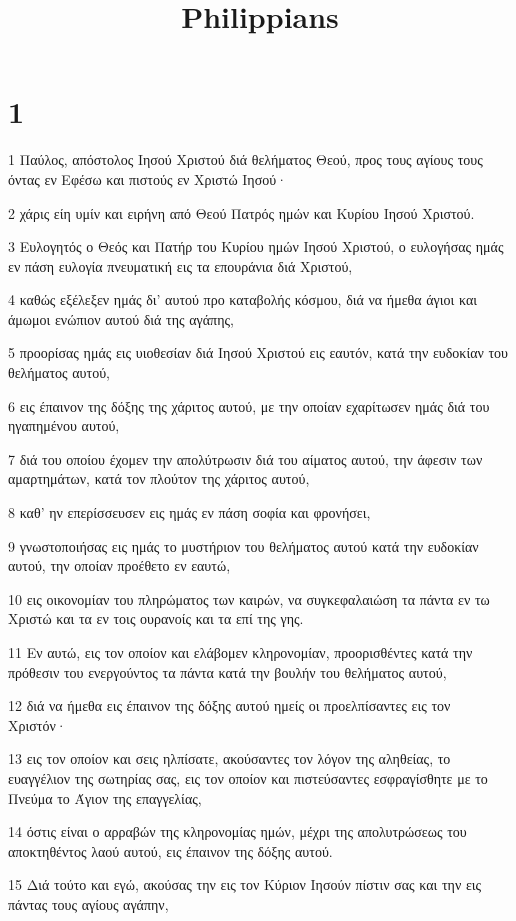 

\title{Philippians}


\chapter{1}

\par 1 Παύλος, απόστολος Ιησού Χριστού διά θελήματος Θεού, προς τους αγίους τους όντας εν Εφέσω και πιστούς εν Χριστώ Ιησού·
\par 2 χάρις είη υμίν και ειρήνη από Θεού Πατρός ημών και Κυρίου Ιησού Χριστού.
\par 3 Ευλογητός ο Θεός και Πατήρ του Κυρίου ημών Ιησού Χριστού, ο ευλογήσας ημάς εν πάση ευλογία πνευματική εις τα επουράνια διά Χριστού,
\par 4 καθώς εξέλεξεν ημάς δι' αυτού προ καταβολής κόσμου, διά να ήμεθα άγιοι και άμωμοι ενώπιον αυτού διά της αγάπης,
\par 5 προορίσας ημάς εις υιοθεσίαν διά Ιησού Χριστού εις εαυτόν, κατά την ευδοκίαν του θελήματος αυτού,
\par 6 εις έπαινον της δόξης της χάριτος αυτού, με την οποίαν εχαρίτωσεν ημάς διά του ηγαπημένου αυτού,
\par 7 διά του οποίου έχομεν την απολύτρωσιν διά του αίματος αυτού, την άφεσιν των αμαρτημάτων, κατά τον πλούτον της χάριτος αυτού,
\par 8 καθ' ην επερίσσευσεν εις ημάς εν πάση σοφία και φρονήσει,
\par 9 γνωστοποιήσας εις ημάς το μυστήριον του θελήματος αυτού κατά την ευδοκίαν αυτού, την οποίαν προέθετο εν εαυτώ,
\par 10 εις οικονομίαν του πληρώματος των καιρών, να συγκεφαλαιώση τα πάντα εν τω Χριστώ και τα εν τοις ουρανοίς και τα επί της γης.
\par 11 Εν αυτώ, εις τον οποίον και ελάβομεν κληρονομίαν, προορισθέντες κατά την πρόθεσιν του ενεργούντος τα πάντα κατά την βουλήν του θελήματος αυτού,
\par 12 διά να ήμεθα εις έπαινον της δόξης αυτού ημείς οι προελπίσαντες εις τον Χριστόν·
\par 13 εις τον οποίον και σεις ηλπίσατε, ακούσαντες τον λόγον της αληθείας, το ευαγγέλιον της σωτηρίας σας, εις τον οποίον και πιστεύσαντες εσφραγίσθητε με το Πνεύμα το Άγιον της επαγγελίας,
\par 14 όστις είναι ο αρραβών της κληρονομίας ημών, μέχρι της απολυτρώσεως του αποκτηθέντος λαού αυτού, εις έπαινον της δόξης αυτού.
\par 15 Διά τούτο και εγώ, ακούσας την εις τον Κύριον Ιησούν πίστιν σας και την εις πάντας τους αγίους αγάπην,
